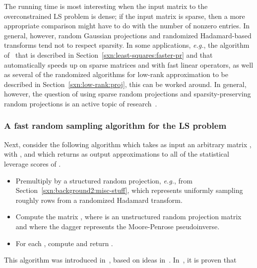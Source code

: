 \documentclass[twoside]{article}
\begin{document}
The  running time is most interesting when the input matrix to 
the overconstrained LS problem is dense; if the input matrix is sparse, then 
a more appropriate comparison might have to do with the number of nonzero 
entries.
In general, however, random Gaussian projections and randomized
Hadamard-based transforms tend not to respect sparsity.
In some applications, \emph{e.g.}, the algorithm of~\cite{MSM11_TR} that 
is described in Section~\ref{sxn:least-squares:faster-pr} and that 
automatically speeds up on sparse matrices and with fast linear operators, 
as well as several of the randomized algorithms for low-rank approximation 
to be described in Section~\ref{sxn:low-rank:proj}, this can be worked around.
In general, however, the question of using sparse random projections and 
sparsity-preserving random projections is an active topic of 
research~\cite{DKT10,KN10_TR,KN10b_TR,GI10}.


\subsubsection{A fast random sampling algorithm for the LS problem}
\label{sxn:least-squares:faster-th:rand-samp}

Next, consider the following algorithm which takes as input an arbitrary 
 matrix , with , and which returns as output
approximations to all  of the statistical leverage scores of .
\begin{itemize}
\item
Premultiply  by a structured random projection, \emph{e.g.}, 
 from Section~\ref{sxn:background2:misc-stuff}, which 
represents uniformly sampling roughly  rows from 
a randomized Hadamard transform.
\item
Compute the  matrix , 
where  is an  unstructured random projection matrix 
and where the dagger represents the Moore-Penrose pseudoinverse.
\item
For each ,
compute and return .
\end{itemize}
This algorithm was introduced in~\cite{DMMW11_TR}, based 
on ideas in~\cite{Malik10_TR}.
In~\cite{DMMW11_TR}, it is proven that 
\end{document}
